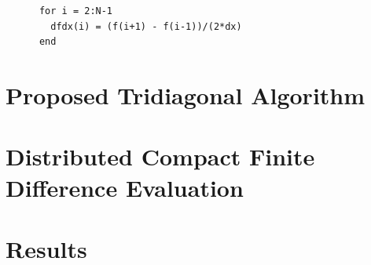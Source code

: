 \documentclass{beamer}
\begin{document}
\begin{frame}[fragile]
  \begin{verbatim}
      for i = 2:N-1
        dfdx(i) = (f(i+1) - f(i-1))/(2*dx)
      end
  \end{verbatim}
\end{frame}






\section{Proposed Tridiagonal Algorithm}
\section{Distributed Compact Finite Difference Evaluation}
\section{Results}
\end{document}
